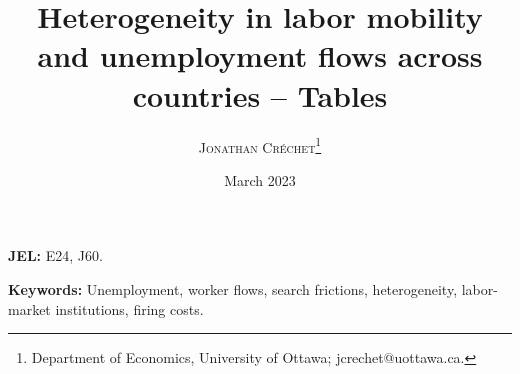 \documentclass[12pt]{article} %
\author{ \textsc{Jonathan Créchet}\thanks{Department of Economics, University of Ottawa; jcrechet@uottawa.ca.} }
\title{Heterogeneity in labor mobility and unemployment flows across countries -- Tables}
\date{March 2023}
\theoremstyle{plain}
\theoremstyle{definition}
\begin{document}
	
	\maketitle
	
	\noindent \textbf{JEL: } E24, J60.
	
	\noindent \textbf{Keywords: } Unemployment, worker flows, search frictions, heterogeneity, labor-market institutions, firing costs.
	
	\newpage
	
	
	
	
	
	
	
	
	
	
	
	
	
	
	
\end{document}
